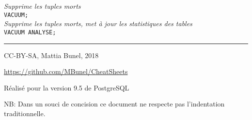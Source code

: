 \documentclass[10pt,landscape, a4paper]{article}
\begin{document}
\begin{multicols}{3}
  \hspace{0.25em} {\scriptsize \emph{Supprime les tuples morts}} \\
 \texttt{VACUUM;}\\

  \hspace{0.25em} {\scriptsize \emph{Supprime les tuples morts, met à jour les statistiques des tables}} \\
 \texttt{VACUUM ANALYSE;}\\

\rule{0.3\linewidth}{0.25pt}
\scriptsize
CC-BY-SA, Mattia Bunel, 2018

\href{https://github.com/MBunel/CheatSheets}{https://github.com/MBunel/CheatSheets}

Réalisé pour la version 9.5 de PostgreSQL

NB: Dans un souci de concision ce document ne respecte pas l'indentation traditionnelle. 

\end{multicols}
\end{document}
